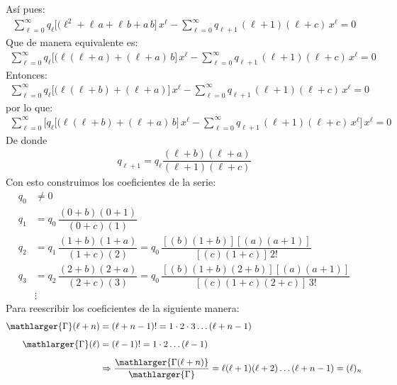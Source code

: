 Así pues:
\begin{align*}
\sum_{\ell=0}^{\infty} q_{\ell} \big[ (\ell^{2} + \ell \, a + \ell \, b + a \, b \big] \, x^{\ell} - \sum_{\ell=0}^{\infty} q_{\ell+1} \, (\ell + 1) (\ell + c) \, x^{\ell} = 0
\end{align*}
Que de manera equivalente es:
\begin{align*}
\sum_{\ell=0}^{\infty} q_{\ell} \big[ (\ell (\ell + a) + (\ell + a) \, b \big] \, x^{\ell} - \sum_{\ell=0}^{\infty} q_{\ell+1} \, (\ell + 1) (\ell + c) \, x^{\ell} = 0
\end{align*}
Entonces:
\begin{align*}
\sum_{\ell=0}^{\infty} q_{\ell} \big[ (\ell (\ell +  b) + (\ell + a) \big] \, x^{\ell} - \sum_{\ell=0}^{\infty} q_{\ell+1} \, (\ell + 1) (\ell + c) \, x^{\ell} = 0
\end{align*}
por lo que:
\begin{align*}
\sum_{\ell=0}^{\infty} \bigg[ q_{\ell} \big[ (\ell (\ell +  b) + (\ell + a) \, b \big] \, x^{\ell} - \sum_{\ell=0}^{\infty} q_{\ell+1} \, (\ell + 1) (\ell + c) \, x^{\ell} \bigg] \, x^{\ell} = 0
\end{align*}
De donde
\begin{align*}
q_{\ell+1} = q_{\ell} \dfrac{(\ell +  b) (\ell + a)}{(\ell + 1) (\ell + c)}
\end{align*}
Con esto construimos los coeficientes de la serie:
\begin{align*}
q_{0} &\neq 0 \\[0.5em]
q_{1} &= q_{0} \, \dfrac{(0+b)(0+1)}{(0+c)(1)} \\[0.5em]
q_{2} &= q_{1} \, \dfrac{(1+b)(1+a)}{(1+c)(2)} = q_{0} \, \dfrac{[(b)(1+b)][(a)(a+1)]}{[(c)(1+c)] \, 2!} \\[0.5em]
q_{3} &= q_{2} \, \dfrac{(2+b)(2+a)}{(2+c)(3)} = q_{0} \, \dfrac{[(b)(1+b)(2+b)][(a)(a+1)]}{[(c)(1+c)(2+c)] \, 3!} \\[0.5em]
&\vdots
\end{align*}
Para reescribir los coeficientes de la siguiente manera:
\begin{align*}
\mathlarger{\Gamma}(\ell + n) &= (\ell + n - 1)! = 1 \cdot 2 \cdot 3 \ldots (\ell + n - 1) \\[0.5em]
\mathlarger{\Gamma} (\ell) &= (\ell - 1)! = 1 \cdot 2 \ldots (\ell - 1) \\[0.5em]
&\Rightarrow \dfrac{\mathlarger{\Gamma(\ell + n)}}{\mathlarger{\Gamma}} = \ell (\ell + 1) (\ell + 2) \ldots (\ell + n -1)  = (\ell)_{n}
\end{align*}
